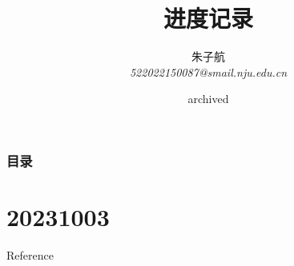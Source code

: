 \documentclass{njupre/njupre}
\title[进度记录]{ 进度记录 }
\author[朱子航]{\texorpdfstring{朱子航 \\ \smallskip \textit{522022150087@smail.nju.edu.cn}}{}}
\date[\today]{\texorpdfstring{archived}{}}
\begin{document}
\begin{frame}
    \titlepage
\end{frame}
\begin{frame}
    \frametitle{目录}
    \tableofcontents
\end{frame}

\section{20231003}


\begin{frame}[allowframebreaks]{Reference}
    
    
\end{frame}
\end{document}
